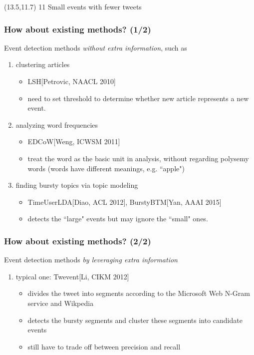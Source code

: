 \documentclass{beamer}
\begin{document}
\begin{frame}
 \begin{textblock}{0.1}(13.5,11.7)
  \footnotesize{11 Small events with fewer tweets}
 \end{textblock}

\end{frame}

\begin{frame}
\frametitle{How about existing methods? (1/2)}
Event detection methods \textit{without extra information}, such as
\begin{enumerate}
\item clustering articles
\begin{itemize}
	\item LSH[Petrovic, NAACL 2010]
	\item need to set threshold to determine whether new article represents a new event.
\end{itemize}
\item analyzing word frequencies
\begin{itemize}
	\item EDCoW[Weng, ICWSM 2011]
	\item treat the word as the basic unit in analysis, without regarding polysemy words (words have different meanings, e.g. ``apple")
\end{itemize}
\item finding bursty topics via topic modeling
\begin{itemize}
	\item TimeUserLDA[Diao, ACL 2012], BurstyBTM[Yan, AAAI 2015]
	\item detects the ``large" events but may ignore the ``small" ones. 
\end{itemize}
\end{enumerate}
\end{frame}

\begin{frame}
\frametitle{How about existing methods? (2/2)}
Event detection methods \textit{by leveraging extra information}
\begin{enumerate}
	\item typical one: Twevent[Li, CIKM 2012]
	\begin{itemize}
		\item divides the tweet into segments according to the Microsoft Web N-Gram service and Wikpedia
		\item detects the bursty segments and cluster these segments into candidate events
		\item still have to trade off between precision and recall
	\end{itemize}
\end{enumerate}
\end{frame}
\end{document}
